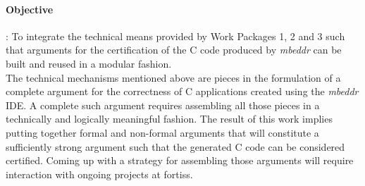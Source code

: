 \paragraph{\textbf{Objective}}: To integrate the technical means provided by
Work Packages 1, 2 and 3 such that arguments for the certification of the C code
produced by \emph{mbeddr} can be built and reused in a modular
fashion.\vspace{.2cm}\\
The technical mechanisms mentioned above are pieces in the formulation of a
complete argument for the correctness of C applications created using the
\emph{mbeddr} IDE.
A complete such argument requires assembling all those pieces in a technically
and logically meaningful fashion. The result of this work implies putting
together formal and non-formal arguments that will constitute a sufficiently
strong argument such that the generated C code can be considered certified.
Coming up with a strategy for assembling those arguments will require
interaction with ongoing projects at fortiss.


